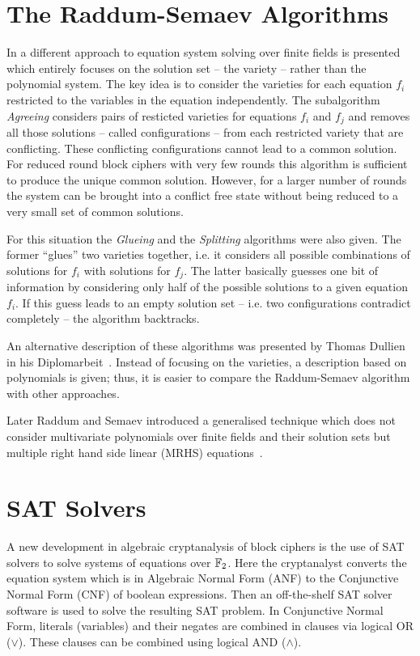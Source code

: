 \section{The Raddum-Semaev Algorithms}

In \cite{Raddum2006} a different approach to equation system solving over finite fields is presented which entirely focuses on the solution set -- the variety -- rather than the polynomial system. The key idea is to consider the varieties for each equation $f_i$ restricted to the variables in the equation independently. The subalgorithm \emph{Agreeing} considers pairs of resticted varieties for equations $f_i$ and $f_j$ and removes all those solutions -- called configurations -- from each restricted variety that are  conflicting. These conflicting configurations cannot lead to a common solution. For reduced round block ciphers with very few rounds this algorithm is sufficient to produce the unique common solution. However, for a larger number of rounds the system can be brought into a conflict free state without being reduced to a very small set of common solutions.

For this situation the \emph{Glueing} and the \emph{Splitting} algorithms were also given. The former ``glues'' two varieties together, i.e. it considers all
possible combinations of solutions for $f_i$ with solutions for $f_j$. The latter basically guesses one bit of information by considering only half of the
possible solutions to a given equation $f_i$. If this guess leads to an empty solution set -- i.e. two configurations contradict completely -- the
algorithm backtracks. 

An alternative description of these algorithms was presented by Thomas Dullien in his Diplomarbeit~\cite{dullien-diplom}. Instead of focusing on the varieties, a description based on polynomials is given; thus, it is easier to compare the Raddum-Semaev algorithm with other approaches.

Later Raddum and Semaev introduced a generalised technique which does not consider multivariate polynomials over finite fields and their solution sets but multiple right hand side linear (MRHS) equations~\cite{Raddum2008}.

\section{SAT Solvers}
\label{sec:sat}
A new development in algebraic cryptanalysis of block ciphers is the use of SAT solvers \cite{Bard2007a, bard-phd, SNC09} to solve systems of equations over $\mathbb{F}_2$. Here the cryptanalyst converts the equation system which is in Algebraic Normal Form (ANF) to the Conjunctive Normal Form (CNF) of boolean expressions. Then an off-the-shelf SAT solver software is used to solve the resulting SAT problem. In Conjunctive Normal Form, literals (variables) and their negates are combined in clauses via logical OR ($\vee$). These clauses can be combined using logical AND ($\wedge$). 

